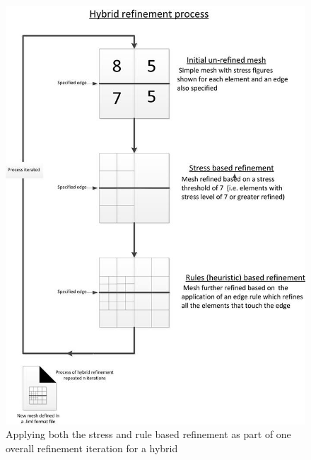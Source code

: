\begin{figure}[H]
  \centerline{\includegraphics[width=150mm, scale=1]{../Graphics/HybridRefinement.jpg}}
  \caption{Applying both the stress and rule based refinement as part of one overall refinement iteration for a hybrid}
  \label{fig:h-refinementImp}
\end{figure}
